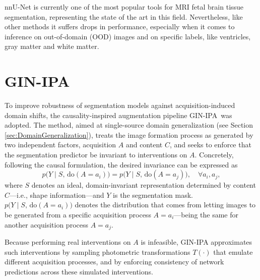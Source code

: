 nnU-Net is currently one of the most popular tools for MRI fetal brain tissue segmentation, representing the state of the art in this field. Nevertheless, like other methods it suffers drops in performance, especially when it comes to inference on out-of-domain (OOD) images and on specific labels, like ventricles, gray matter and white matter.

\section{GIN-IPA} \label{sec:gin-ipa}
To improve robustness of segmentation models against acquisition-induced domain shifts, the causality-inspired augmentation pipeline GIN-IPA\,\cite{Ouyang2023} was adopted. The method, aimed at single-source domain generalization (see Section \ref{sec:DomainGeneralization}), treats the image formation process as generated by two independent factors, acquisition $A$ and content $C$, and seeks to enforce that the segmentation predictor be invariant to interventions on $A$. Concretely, following the causal formulation, the desired invariance can be expressed as
\begin{equation}\label{eq:domain-inv}
    p\bigl(Y\mid S,\,\mathrm{do}(A= a_i)\bigr) 
    = p\bigl(Y\mid S,\,\mathrm{do}(A= a_j)\bigr), \quad \forall a_i,a_j,
\end{equation}
where $S$ denotes an ideal, domain-invariant representation determined by content $C$---i.e., shape information---and $Y$ is the segmentation mask. $p\bigl(Y\mid S,\,\mathrm{do}(A= a_i)\bigr)$ denotes the distribution that comes from letting images to be generated from a specific acquisition process $A = a_i$---being the same for another acquisition process $A = a_j$.

Because performing real interventions on $A$ is infeasible, GIN-IPA approximates such interventions by sampling photometric transformations $T(\cdot)$ that emulate different acquisition processes, and by enforcing consistency of network predictions across these simulated interventions.

